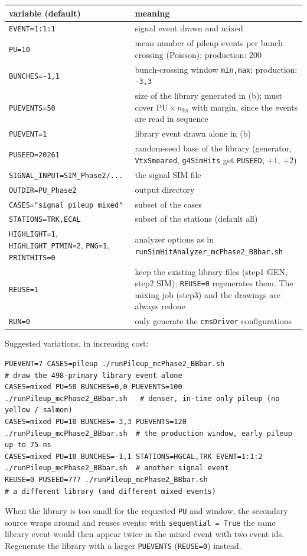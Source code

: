 \documentclass[11pt,a4paper]{article}
\newcommand{\code}[1]{\texttt{#1}}
\newcommand{\bx}{\ensuremath{\mathrm{bx}}}
\begin{document}
\begin{center}\small
\begin{tabularx}{\textwidth}{>{\raggedright\arraybackslash}p{58mm}X}
\toprule
variable (default) & meaning \\
\midrule
\code{EVENT=1:1:1} & signal event drawn and mixed \\
\code{PU=10} & mean number of pileup events per bunch crossing (Poisson); production: 200 \\
\code{BUNCHES=-1,1} & bunch-crossing window \code{min,max}; production: \code{-3,3} \\
\code{PUEVENTS=50} & size of the library generated in (b); must cover $\mathrm{PU}\times n_{\bx}$ with margin, since the events are read in sequence \\
\code{PUEVENT=1} & library event drawn alone in (b) \\
\code{PUSEED=20261} & random-seed base of the library (generator, \code{VtxSmeared}, \code{g4SimHits} get \code{PUSEED}, $+1$, $+2$) \\
\code{SIGNAL\_INPUT=SIM\_Phase2/...} & the signal SIM file \\
\code{OUTDIR=PU\_Phase2} & output directory \\
\code{CASES="signal pileup mixed"} & subset of the cases \\
\code{STATIONS=TRK,ECAL} & subset of the stations (default all) \\
\code{HIGHLIGHT=1}, \code{HIGHLIGHT\_PTMIN=2}, \code{PNG=1}, \code{PRINTHITS=0} & analyzer options as in \code{runSimHitAnalyzer\_mcPhase2\_BBbar.sh} \\
\code{REUSE=1} & keep the existing library files (step1 GEN, step2 SIM); \code{REUSE=0} regenerates them. The
  mixing job (step3) and the drawings are always redone \\
\code{RUN=0} & only generate the \code{cmsDriver} configurations \\
\bottomrule
\end{tabularx}
\end{center}

Suggested variations, in increasing cost:
\begin{lstlisting}[style=sh]
PUEVENT=7 CASES=pileup ./runPileup_mcPhase2_BBbar.sh                     # draw the 498-primary library event alone
CASES=mixed PU=50 BUNCHES=0,0 PUEVENTS=100 ./runPileup_mcPhase2_BBbar.sh   # denser, in-time only pileup (no yellow / salmon)
CASES=mixed PU=10 BUNCHES=-3,3 PUEVENTS=120 ./runPileup_mcPhase2_BBbar.sh  # the production window, early pileup up to 75 ns
CASES=mixed PU=10 BUNCHES=-1,1 STATIONS=HGCAL,TRK EVENT=1:1:2 ./runPileup_mcPhase2_BBbar.sh  # another signal event
REUSE=0 PUSEED=777 ./runPileup_mcPhase2_BBbar.sh                          # a different library (and different mixed events)
\end{lstlisting}
When the library is too small for the requested \code{PU} and window, the secondary source wraps around
and reuses events: with \code{sequential = True} the same library event would then appear twice in the
mixed event with two event ids. Regenerate the library with a larger \code{PUEVENTS} (\code{REUSE=0}) instead.
\end{document}
